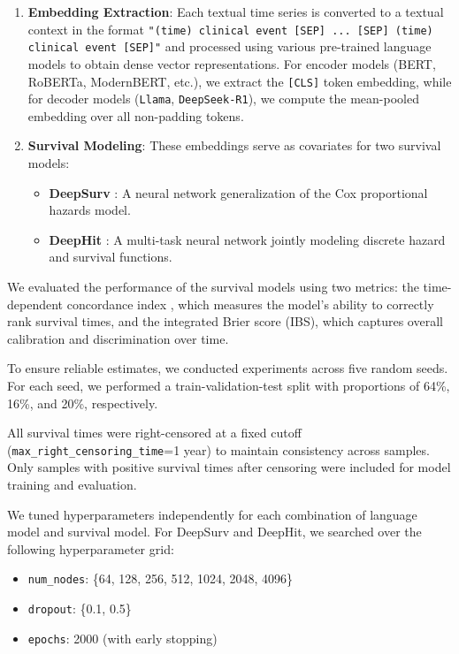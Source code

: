 \begin{enumerate}
\item \textbf{Embedding Extraction}: Each textual time series is converted to a textual context in the format \texttt{"(time) clinical event [SEP] ... [SEP] (time) clinical event [SEP]"} and processed using various pre-trained language models to obtain dense vector representations. 
For encoder models (BERT, RoBERTa, ModernBERT, etc.), we extract the \texttt{[CLS]} token embedding, while for decoder models (\texttt{Llama}, \texttt{DeepSeek-R1}), we compute the mean-pooled embedding over all non-padding tokens.

\item \textbf{Survival Modeling}: These embeddings serve as covariates for two survival models:
\begin{itemize}
    \item \textbf{DeepSurv} \citep{katzman2018deepsurv}: A neural network generalization of the Cox proportional hazards model.
    \item \textbf{DeepHit} \citep{lee2018deephit}: A multi-task neural network jointly modeling discrete hazard and survival functions.
\end{itemize}
\end{enumerate}

We evaluated the performance of the survival models using two metrics: the time-dependent concordance index \citep{antolini2005time}, which measures the model’s ability to correctly rank survival times, and the integrated Brier score (IBS), which captures overall calibration and discrimination over time. 

To ensure reliable estimates, we conducted experiments across five random seeds.
For each seed, we performed a train-validation-test split with proportions of 64\%, 16\%, and 20\%, respectively. 

All survival times were right-censored at a fixed cutoff (\texttt{max\_right\_censoring\_time}=1 year) to maintain consistency across samples. 
Only samples with positive survival times after censoring were included for model training and evaluation.

We tuned hyperparameters independently for each combination of language model and survival model. 
For DeepSurv and DeepHit, we searched over the following hyperparameter grid:
\begin{itemize}
    \item \texttt{num\_nodes}: \{64, 128, 256, 512, 1024, 2048, 4096\}
    \item \texttt{dropout}: \{0.1, 0.5\}
    \item \texttt{epochs}: 2000 (with early stopping)
\end{itemize}

